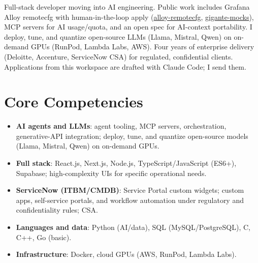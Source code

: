 \documentclass[11pt,a4paper,sans]{moderncv}
\begin{document}
\makecvtitle


\vspace{6pt}
\small{Full-stack developer moving into AI engineering. Public work includes Grafana Alloy remotecfg with human-in-the-loop apply (\href{https://github.com/carl0sfelipe/alloy-remotecfg}{alloy-remotecfg}, \href{https://github.com/carl0sfelipe/gigante-mocks}{gigante-mocks}), MCP servers for AI usage/quota, and an open spec for AI-context portability. I deploy, tune, and quantize open-source LLMs (Llama, Mistral, Qwen) on on-demand GPUs (RunPod, Lambda Labs, AWS). Four years of enterprise delivery (Deloitte, Accenture, ServiceNow CSA) for regulated, confidential clients. Applications from this workspace are drafted with Claude Code; I send them.}


\section{Core Competencies}
\vspace{1pt}
\begin{itemize}

\item \textbf{AI agents and LLMs}: agent tooling, MCP servers, orchestration, generative-API integration; deploy, tune, and quantize open-source models (Llama, Mistral, Qwen) on on-demand GPUs.

\item \textbf{Full stack}: React.js, Next.js, Node.js, TypeScript/JavaScript (ES6+), Supabase; high-complexity UIs for specific operational needs.

\item \textbf{ServiceNow (ITBM/CMDB)}: Service Portal custom widgets; custom apps, self-service portals, and workflow automation under regulatory and confidentiality rules; CSA.

\item \textbf{Languages and data}: Python (AI/data), SQL (MySQL/PostgreSQL), C, C++, Go (basic).

\item \textbf{Infrastructure}: Docker, cloud GPUs (AWS, RunPod, Lambda Labs).

\end{itemize}
\end{document}
